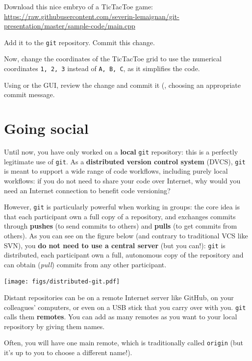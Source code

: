 \documentclass{instructions}
\newcommand{\git}{\texttt{git}\xspace}
\begin{document}

Download this nice embryo of a TicTacToe game:\\
\url{https://raw.githubusercontent.com/severin-lemaignan/git-presentation/master/sample-code/main.cpp}

Add it to the \git repository. Commit this change.

Now, change the coordinates of the TicTacToe grid to use the numerical
coordinates \texttt{1, 2, 3} instead of \texttt{A, B, C}, as it simplifies the code.

Using  or the GUI, review the change and commit it (, choosing an appropriate commit message.

\part{Going social}

Until now, you have only worked on a \textbf{local} \git repository: this is a
perfectly legitimate use of \git. As a \textbf{distributed version control
system} (DVCS), \git is meant to support a wide range of code workflows,
including purely local workflows: if you do not need to share your code over
Internet, why would you need an Internet connection to benefit code versioning?

However, \git is particularly powerful when working in groups: the core idea is
that each participant own a full copy of a repository, and exchanges commits
through \textbf{pushes} (to send commits to others) and \textbf{pulls} (to get
commits from others). As you can see on the figure below (and contrary to
traditional VCS like SVN), you \textbf{do not
need to use a central server} (but you can!): \git is distributed, each
participant own a full, autonomous copy of the repository and can obtain
(\emph{pull}) commits from any other participant.

\begin{center}
    \texttt{[image: figs/distributed-git.pdf]}
\end{center}

Distant repositories can be on a remote Internet server like GitHub, on your
colleagues' computers,
or even on a USB stick that you carry over with you. \git calls them
\textbf{remotes}. You can add as many remotes as you want to your local
repository by giving them names.

Often, you will have one main remote, which is traditionally called
\texttt{origin} (but it's up to you to choose a different name!).
\end{document}
